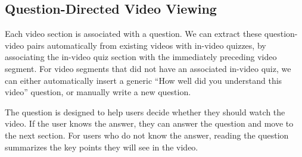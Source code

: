 \documentclass{sigchi}
\begin{document}
\subsection{Question-Directed Video Viewing}
Each video section is associated with a question. We can extract these question-video pairs automatically from existing videos with in-video quizzes, by associating the in-video quiz section with the immediately preceding video segment. For video segments that did not have an associated in-video quiz, we can either automatically insert a generic ``How well did you understand this video'' question, or manually write a new question.

The question is designed to help users decide whether they should watch the video. If the user knows the answer, they can answer the question and move to the next section. For users who do not  know the answer, reading the question summarizes the key points they will see in the video.



\end{document}
